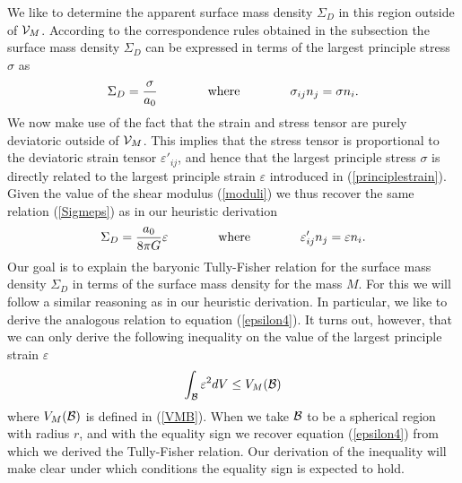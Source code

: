\documentclass[a4paper,12pt]{article}
\begin{document}
We like to determine the apparent surface mass density $\Sigma_D$ in this region outside of ${\cal V}_M$.  %
According to the correspondence rules obtained in the   subsection the surface mass density $\Sigma_D$ can be expressed in terms of the largest principle stress $\sigma$ as 
\begin{equation}
\Sigma_D = {\sigma\over a_0}  \qquad \qquad \mbox{where} \qquad \qquad  \sigma_{ij} n_j  =\sigma n_i . 
\end{equation}
We now make use of the fact that the strain and stress tensor are purely deviatoric outside of ${\cal V}_M$. This implies that the stress tensor is proportional to the deviatoric strain tensor $\varepsilon'_{ij}$, and hence that the largest principle stress $\sigma$ is directly related to the largest principle strain $\varepsilon$ introduced in (\ref{principlestrain}).  Given the value of the shear modulus (\ref{moduli}) we thus recover the same relation (\ref{Sigmeps}) as in our heuristic derivation
\begin{equation}
\label{SigmaD}
\Sigma_D = {a_0\over 8\pi G}\varepsilon\qquad \qquad \mbox{where} \qquad \qquad  \varepsilon'_{ij} n_j  =\varepsilon n_i .
\end{equation}
Our goal is to explain the baryonic 
Tully-Fisher relation for the surface 
mass density $\Sigma_D$ in terms of 
the surface mass density for the mass 
$M$.  For this we will follow a similar reasoning as in our heuristic derivation.  In particular, we like to 
derive the analogous relation to equation (\ref{epsilon4}). It turns out, however, that we can only derive the following inequality on the value of the largest principle strain $\varepsilon$
\begin{equation}
\label{TFineq}
\int_{\cal B} \varepsilon^2 dV \leq V_M({\cal B})  %
\end{equation}
where $V_M({\cal B})$ is defined in (\ref{VMB}).  When we take $\cal B$ to be a spherical region with radius $r$, and with the equality sign we recover equation (\ref{epsilon4}) from which we derived the Tully-Fisher relation. Our derivation of the inequality will make clear under which conditions the equality sign is expected to hold. 
\end{document}
